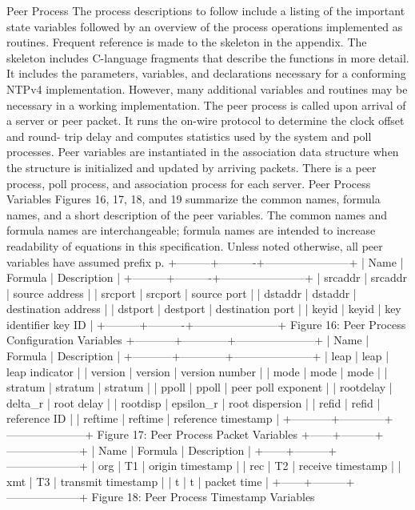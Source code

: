  Peer Process
 The process descriptions to follow include a listing of the important
 state variables followed by an overview of the process operations
 implemented as routines. Frequent reference is made to the skeleton
 in the appendix. The skeleton includes C-language fragments that
 describe the functions in more detail. It includes the parameters,
 variables, and declarations necessary for a conforming NTPv4
 implementation. However, many additional variables and routines may
 be necessary in a working implementation.
 The peer process is called upon arrival of a server or peer packet.
 It runs the on-wire protocol to determine the clock offset and round-
 trip delay and computes statistics used by the system and poll
 processes. Peer variables are instantiated in the association data
 structure when the structure is initialized and updated by arriving
 packets. There is a peer process, poll process, and association
 process for each server.
 Peer Process Variables
 Figures 16, 17, 18, and 19 summarize the common names, formula names,
 and a short description of the peer variables. The common names and
 formula names are interchangeable; formula names are intended to
 increase readability of equations in this specification. Unless
 noted otherwise, all peer variables have assumed prefix p.
 +---------+----------+-----------------------+
 | Name | Formula | Description |
 +---------+----------+-----------------------+
 | srcaddr | srcaddr | source address |
 | srcport | srcport | source port |
 | dstaddr | dstaddr | destination address |
 | dstport | destport | destination port |
 | keyid | keyid | key identifier key ID |
 +---------+----------+-----------------------+
 Figure 16: Peer Process Configuration Variables
 +-----------+------------+---------------------+
 | Name | Formula | Description |
 +-----------+------------+---------------------+
 | leap | leap | leap indicator |
 | version | version | version number |
 | mode | mode | mode |
 | stratum | stratum | stratum |
 | ppoll | ppoll | peer poll exponent |
 | rootdelay | delta_r | root delay |
 | rootdisp | epsilon_r | root dispersion |
 | refid | refid | reference ID |
 | reftime | reftime | reference timestamp |
 +-----------+------------+---------------------+
 Figure 17: Peer Process Packet Variables
 +------+---------+--------------------+
 | Name | Formula | Description |
 +------+---------+--------------------+
 | org | T1 | origin timestamp |
 | rec | T2 | receive timestamp |
 | xmt | T3 | transmit timestamp |
 | t | t | packet time |
 +------+---------+--------------------+
 Figure 18: Peer Process Timestamp Variables
